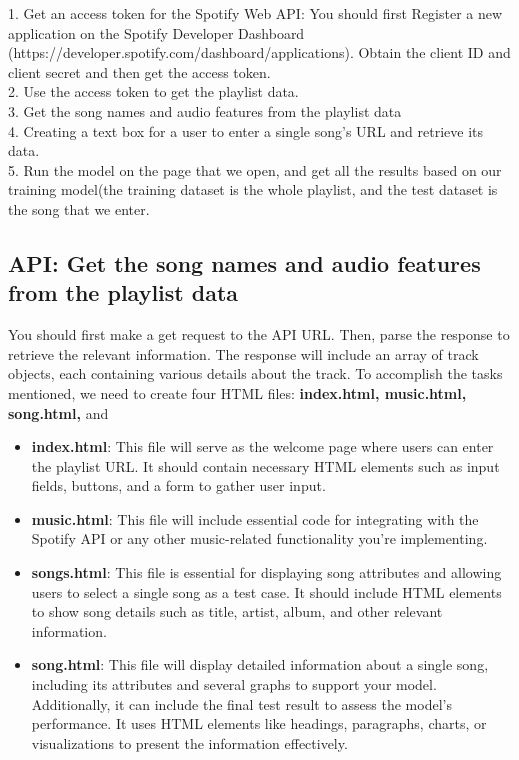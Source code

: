 \documentclass[titlepage]{article}
\begin{document}
1. Get an access token for the Spotify Web API:
You should first Register a new application on the Spotify Developer Dashboard (https://developer.spotify.com/dashboard/applications).
Obtain the client ID and client secret and then get the access token.\\
2. Use the access token to get the playlist data.\\
3. Get the song names and audio features from the playlist data\\
4. Creating a text box for a user to enter a single song's URL and retrieve its data.\\
5. Run the model on the page that we open, and get all the results based on our training model(the training dataset is the whole playlist, and the test dataset is the song that we enter.


\subsection{API: Get the song names and audio features from the playlist data}
You should first make a get request to the API URL. Then, parse the response to retrieve the relevant information. The response will include an array of track objects, each containing various details about the track. To accomplish the tasks mentioned, we need to create four HTML files: \textbf{index.html, music.html, song.html,} and \begin{itemize} 
    \item \textbf{index.html}: This file will serve as the welcome
        page where users can enter the playlist URL. It should contain necessary
        HTML elements such as input fields, buttons, and a form to gather user
        input.  
    \item \textbf{music.html}: This file will include essential code for
        integrating with the Spotify API or any other music-related functionality
        you're implementing.  
    \item \textbf{songs.html}: This file is essential for
        displaying song attributes and allowing users to select a single song as a
        test case. It should include HTML elements to show song details such as
        title, artist, album, and other relevant information.  
    \item \textbf{song.html}: This file will display detailed information about a
        single song, including its attributes and several graphs to support your
        model. Additionally, it can include the final test result to assess the
        model's performance. It uses HTML elements like headings, paragraphs,
        charts, or visualizations to present the information effectively.
\end{itemize}
\end{document}
